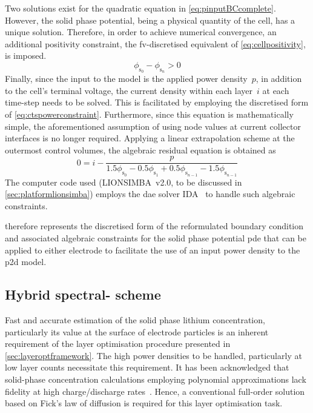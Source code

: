 
    Two     solutions     exist     for    the     quadratic     equation     in
    \cref{eq:pinputBCcomplete}.  However, the  solid  phase  potential, being  a
    physical quantity of the cell, has a unique solution. Therefore, in order to
    achieve  numerical convergence,  an  additional  positivity constraint,  the
    \gls{fv}-discretised equivalent of \cref{eq:cellpositivity}, is imposed.
    \begin{equation}\label{eq:discpositivity}
	    \phi_{\text{s}_0} - \phi_{\text{s}_n} > 0
    \end{equation}
    Finally,   since   the  input   to   the   model   is  the   applied   power
    density~$p$, in addition to the cell's terminal voltage, the  current
    density  within  each  layer~$i$ at each time-step needs  to  be solved.  This   is  facilitated  by  employing   the  discretised  form
    of  \cref{eq:ctspowerconstraint}.   Furthermore,  since  this   equation  is
    mathematically simple, the aforementioned assumption of using node values at
    current  collector  interfaces is  no  longer  required. Applying  a  linear
    extrapolation  scheme  at  the  outermost  control  volumes,  the  algebraic
    residual equation is obtained as
    \begin{equation}\label{eq:currdensityresidual}
        0 = i - \frac{p}{1.5 \phi_{\mathrm{s}_0} - 0.5 \phi_{\mathrm{s}_1} + 0.5 \phi_{\mathrm{s}_{n-1}} - 1.5 \phi_{\mathrm{s}_{n-1}}}
    \end{equation}
    The    computer    code    used    (LIONSIMBA~v2.0,    to    be    discussed
    in    \cref{sec:platformlionsimba})    employs    the    \gls{dae}    solver
    IDA~\cite{sundials2005} to handle such algebraic constraints.

     therefore represents
    the discretised form  of the reformulated boundary  condition and associated
    algebraic constraints  for the solid  phase potential \gls{pde} that  can be
    applied to either electrode to facilitate  the use of an input power density
    to the \gls{p2d} model.

    \subsection{Hybrid spectral- scheme}\label{sec:hybridfv-spectral}

    Fast  and accurate  estimation  of the  solid  phase lithium  concentration,
    particularly  its  value  at  the  surface  of  electrode  particles  is  an
    inherent  requirement  of  the  layer optimisation  procedure  presented  in
    \cref{sec:layeroptframework}.  The  high  power  densities  to  be  handled,
    particularly  at  low layer  counts  necessitate  this requirement.  It  has
    been  acknowledged  that  solid-phase concentration  calculations  employing
    polynomial   approximations   lack   fidelity   at   high   charge/discharge
    rates~\cite{Santhanagopalan2006}. Hence, a  conventional full-order solution
    based on  Fick's law of  diffusion is  required for this  layer optimisation
    task.

